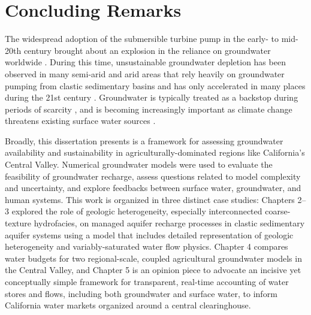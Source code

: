 \chapter[Concluding Remarks.]{Concluding Remarks}

The widespread adoption of the submersible turbine pump in the early- to mid-20th century brought about an explosion in the reliance on groundwater worldwide \citep{alley2002flow}. During this time, unsustainable groundwater depletion has been observed in many semi-arid and arid areas that rely heavily on groundwater pumping from clastic sedimentary basins \citep{konikow2013groundwater,taylor2013ground,wada2010global,wada2012nonsustainable} and has only accelerated in many places during the 21st century \citep{wada2011modelling}. Groundwater is typically treated as a backstop during periods of scarcity \citep{hanson2012method}, and is becoming increasingly important as climate change threatens existing surface water sources \citep{milly2008stationarity,mirchi2013climate}.

Broadly, this dissertation presents is a framework for assessing groundwater availability and sustainability in agriculturally-dominated regions like California's Central Valley. Numerical groundwater models were used to evaluate the feasibility of groundwater recharge, assess questions related to model complexity and uncertainty, and explore feedbacks between surface water, groundwater, and human systems. This work is organized in three distinct case studies: Chapters 2--3 explored the role of geologic heterogeneity, especially interconnected coarse-texture hydrofacies, on managed aquifer recharge processes in clastic sedimentary aquifer systems using a model that includes detailed representation of geologic heterogeneity and variably-saturated water flow physics. Chapter 4 compares water budgets for two regional-scale, coupled agricultural groundwater models in the Central Valley, and Chapter 5 is an opinion piece to advocate an incisive yet conceptually simple framework for transparent, real-time accounting of water stores and flows, including both groundwater and surface water, to inform California water markets organized around a central clearinghouse. 

